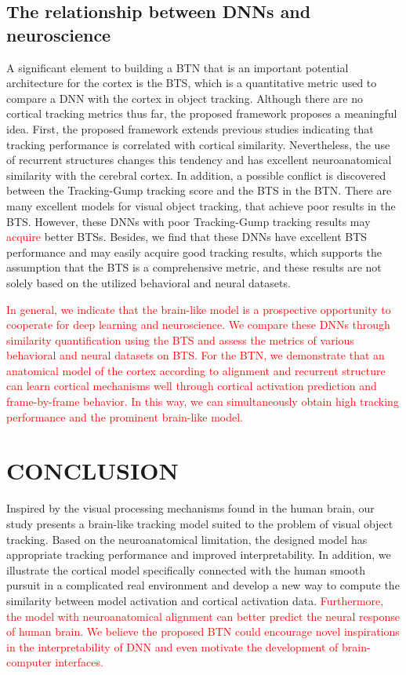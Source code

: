 \documentclass[final,3p,times,twocolumn]{elsarticle}
\begin{document}
\subsection{The relationship between DNNs and neuroscience}
A significant element to building a BTN that is an important potential architecture for the cortex is the BTS, which is a quantitative metric used to compare a DNN with the cortex in object tracking. 
Although there are no cortical tracking metrics thus far, the proposed framework proposes a meaningful idea. 
First, the proposed framework extends previous studies indicating that tracking performance is correlated with cortical similarity.
Nevertheless, the use of recurrent structures changes this tendency and has excellent neuroanatomical similarity with the cerebral cortex. 
In addition, a possible conflict is discovered between the Tracking-Gump tracking score and the BTS in the BTN.
There are many excellent models for visual object tracking, 
that achieve poor results in the BTS.
However, these DNNs with poor Tracking-Gump tracking results may \textcolor{red}{acquire} better BTSs. 
Besides, we find that these DNNs have excellent BTS performance and may easily acquire good tracking results, which supports the assumption that the BTS is a comprehensive metric, and these results are not solely based on the utilized behavioral and neural datasets. 


\textcolor{red}{
In general, we indicate that the brain-like model is a prospective opportunity to cooperate for deep learning and neuroscience. 
We compare these DNNs through similarity quantification using the BTS 
and assess the metrics of various behavioral and neural datasets on BTS. 
For the BTN, we demonstrate that an anatomical model of the cortex according to alignment and recurrent structure can learn cortical mechanisms well through cortical activation prediction and frame-by-frame behavior. 
In this way, we can simultaneously obtain high tracking performance and the prominent brain-like model.}



\section{CONCLUSION}
Inspired by the visual processing mechanisms found in the human brain, our study presents a brain-like tracking model suited to the problem of visual object tracking. 
Based on the neuroanatomical limitation, the designed model has appropriate tracking performance and improved interpretability. 
In addition, we illustrate the cortical model specifically connected with the human smooth pursuit in a complicated real environment 
and develop a new way to compute the similarity between model activation and cortical activation data. 
\textcolor{red}{
Furthermore, the model with neuroanatomical alignment can better predict the neural response of human brain. 
We believe the proposed BTN could encourage novel inspirations in the interpretability of DNN 
and even motivate the development of brain-computer interfaces.}
\end{document}
